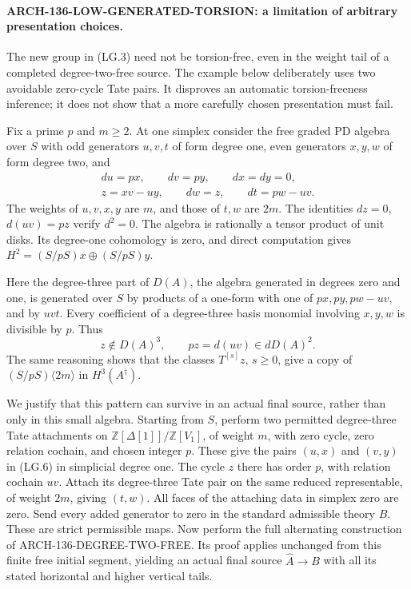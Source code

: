 \paragraph{ARCH-136-LOW-GENERATED-TORSION: a limitation of arbitrary presentation choices.}
The new group in (LG.3) need not be torsion-free, even in the
weight tail of a completed degree-two-free source. The example
below deliberately uses two avoidable zero-cycle Tate pairs.
It disproves an automatic torsion-freeness inference; it does
not show that a more carefully chosen presentation must fail.

Fix a prime \(p\) and \(m\geq2\). At one simplex consider the
free graded PD algebra over \(S\) with odd generators
\(u,v,t\) of form degree one, even generators \(x,y,w\) of
form degree two, and
\[
 \begin{gathered}
 du=px,\qquad dv=py,\qquad dx=dy=0,\\
 z=xv-uy,\qquad dw=z,\qquad dt=pw-uv.
 \end{gathered}
 \tag{LG.6}
\]
The weights of \(u,v,x,y\) are \(m\), and those of \(t,w\)
are \(2m\). The identities \(dz=0\), \(d(uv)=pz\) verify
\(d^2=0\). The algebra is rationally a tensor product of unit
disks. Its degree-one cohomology is zero, and direct computation
gives \(H^2=(S/pS)x\oplus(S/pS)y\).

Here the degree-three part of \(D(A)\), the algebra generated
in degrees zero and one, is generated over \(S\) by products
of a one-form with one of
\(px,py,pw-uv\), and by \(uvt\). Every coefficient of a
degree-three basis monomial involving \(x,y,w\) is divisible
by \(p\). Thus
\[
 z\notin D(A)^3,
 \qquad pz=d(uv)\in dD(A)^2.
 \tag{LG.7}
\]
The same reasoning shows that the classes
\(T^{[s]}z\), \(s\geq0\), give a copy of
\((S/pS)\langle2m\rangle\) in \(H^3(A^\dagger)\).

We justify that this pattern can survive in an actual final source,
rather than only in this small algebra. Starting from \(S\),
perform two permitted degree-three Tate attachments on
\(\mathbb Z[\Delta[1]]/\mathbb Z[V_1]\), of weight \(m\),
with zero cycle, zero relation cochain, and chosen integer \(p\).
These give the pairs \((u,x)\) and \((v,y)\) in (LG.6) in
simplicial degree one. The cycle \(z\) there has order \(p\),
with relation cochain \(uv\). Attach its degree-three Tate pair
on the same reduced representable, of weight \(2m\), giving
\((t,w)\). All faces of the attaching data in simplex zero
are zero. Send every added generator to zero in the standard
admissible theory \(B\). These are strict permissible maps.
Now perform the full alternating construction of
ARCH-136-DEGREE-TWO-FREE. Its proof applies unchanged from this
finite free initial segment, yielding an actual final source
\(\widehat A\to B\) with all its stated horizontal and higher
vertical tails.

